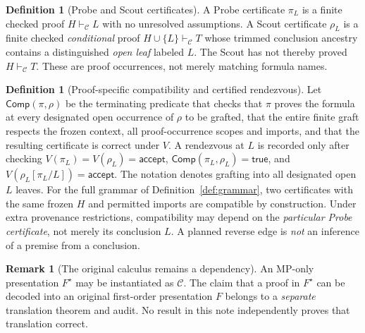 \documentclass[11pt,letterpaper]{article}
\theoremstyle{definition}
\newtheorem{definition}[theorem]{Definition}
\newtheorem{remark}[theorem]{Remark}
\newcommand{\C}{\mathcal C}
\newcommand{\vdC}{\vdash_{\mathcal C}}
\begin{document}
\begin{definition}[Probe and Scout certificates]
A Probe certificate $\pi_L$ is a finite checked proof $H\vdC L$ with no
unresolved assumptions. A Scout certificate $\rho_L$ is a finite checked
\emph{conditional} proof $H\cup\{L\}\vdC T$ whose trimmed conclusion ancestry
contains a distinguished \emph{open leaf} labeled $L$. The Scout has not thereby
proved $H\vdC T$. These are proof occurrences, not merely matching formula names.
\end{definition}

\begin{definition}[Proof-specific compatibility and certified rendezvous]
Let $\mathsf{Comp}(\pi,\rho)$ be the terminating predicate that checks that
$\pi$ proves the formula at every designated open occurrence of $\rho$ to
be grafted, that the entire finite graft respects the frozen context, all
proof-occurrence scopes and imports, and that the resulting certificate is
correct under $V$. A rendezvous at $L$ is recorded only after checking
$V(\pi_L)=V(\rho_L)=\mathsf{accept}$,
$\mathsf{Comp}(\pi_L,\rho_L)=\mathsf{true}$, and
$V(\rho_L[\pi_L/L])=\mathsf{accept}$.
The notation denotes grafting into all designated open $L$ leaves.
For the full grammar of Definition~\ref{def:grammar}, two certificates
with the same frozen $H$ and permitted imports are compatible by
construction. Under extra provenance restrictions, compatibility may depend
on the \emph{particular Probe certificate}, not merely its conclusion $L$.
A planned reverse edge is \emph{not} an inference of a premise from a
conclusion.
\end{definition}

\begin{remark}[The original calculus remains a dependency]
An MP-only presentation $F^\star$ may be instantiated as $\C$. The claim
that a proof in $F^\star$ can be decoded into an original first-order
presentation $F$ belongs to a \emph{separate} translation theorem and audit.
No result in this note independently proves that translation correct.
\end{remark}
\end{document}
